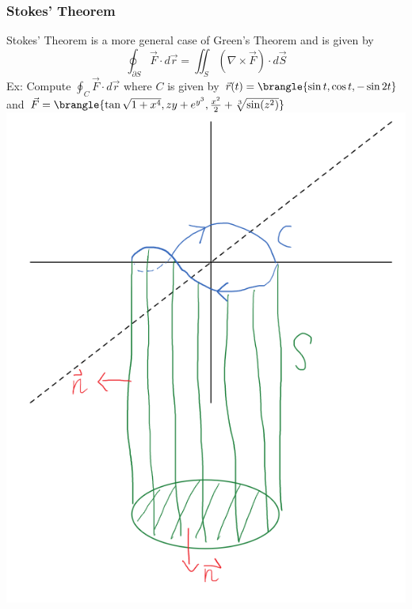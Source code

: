 \subsubsection{Stokes' Theorem}
Stokes' Theorem is a more general case of Green's Theorem and is given by
$$\oint_{\partial S}\vec{F}\cdot d\vec{r}=\iint_S(\nabla\times\vec{F})\cdot d\vec{S}$$
Ex: Compute $\oint_C\vec{F}\cdot d\vec{r}$ where $C$ is given by $\vec{r}(t)=\brangle{\sin t,\cos t,-\sin 2t}$\\
and $\vec{F}=\brangle{\tan\sqrt{1+x^4},zy+e^{y^3},\frac{x^2}{2}+\sqrt[3]{\sin(z^2)}}$\\
\includegraphics[scale=0.5]{Images/Math217Pictures/stokesThmEx.png}
